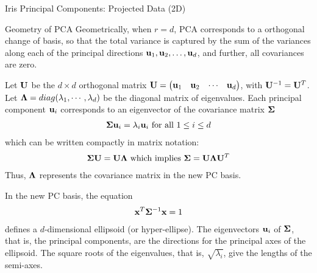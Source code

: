 \begin{frame}{Iris Principal Components: Projected Data (2D)}

\centering

\end{frame}


\begin{frame}{Geometry of PCA}
  \small
Geometrically, when $r=d$,
PCA corresponds to a orthogonal change of basis, 
so that the total variance
is captured by the sum of the variances along each of the
principal directions $\mathbf{u}_1, \mathbf{u}_2, \ldots, \mathbf{u}_d$, and
further, all covariances are zero.

\smallskip
Let $\mathbf{U}$ be the $d
\times d$ orthogonal matrix
$\mathbf{U} = \begin{pmatrix} \mathbf{u}_1 & \mathbf{u}_2 & \cdots & \mathbf{u}_d \end{pmatrix}$,
with $\mathbf{U}^{-1} = \mathbf{U}^T$.
Let ${\bm \Lambda} = diag(\lambda_1, \cdots, \lambda_d)$ be
the diagonal matrix of eigenvalues.
Each principal component $\mathbf{u}_i$ corresponds
to an eigenvector of the covariance matrix ${\bm \Sigma}$
\begin{align*}
  {\bm \Sigma} \mathbf{u}_i = \lambda_i \mathbf{u}_i \mbox{ for all } 1 \le i \le d
\end{align*}
which can be written compactly in matrix notation:
\begin{align*}
  {\bm \Sigma}\mathbf{U} =  \mathbf{U} {\bm \Lambda} \text{ which implies }
  {\bm \Sigma} =  \mathbf{U} {\bm \Lambda} \mathbf{U}^T
\end{align*}
Thus, ${\bm \Lambda}$ represents the covariance matrix in the new PC basis.


\smallskip
In the new PC basis, the equation
\begin{align*}
    \mathbf{x}^T {\bm \Sigma}^{-1} \mathbf{x} = 1
\end{align*}
def\/{i}nes a $d$-dimensional ellipsoid (or hyper-ellipse). The
eigenvectors $\mathbf{u}_i$ of ${\bm \Sigma}$, that is, the principal components,
are the directions for the principal axes of the ellipsoid. The
square roots of the eigenvalues, that is, $\sqrt{\lambda_i}$, give
the lengths of the semi-axes.

\end{frame}



